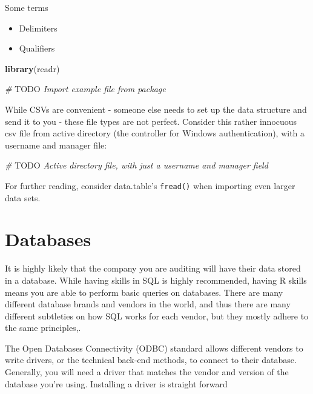 \documentclass[
]{book}
\newenvironment{Shaded}{\begin{snugshade}}{\end{snugshade}}
\newcommand{\AlertTok}[1]{\textcolor[rgb]{0.94,0.16,0.16}{#1}}
\newcommand{\CommentTok}[1]{\textcolor[rgb]{0.56,0.35,0.01}{\textit{#1}}}
\newcommand{\KeywordTok}[1]{\textcolor[rgb]{0.13,0.29,0.53}{\textbf{#1}}}
\newcommand{\NormalTok}[1]{#1}
\providecommand{\tightlist}{%
  \setlength{\itemsep}{0pt}\setlength{\parskip}{0pt}}
\begin{document}
Some terms

\begin{itemize}
\tightlist
\item
  Delimiters
\item
  Qualifiers
\end{itemize}

\begin{Shaded}
\begin{Highlighting}[]
\KeywordTok{library}\NormalTok{(readr)}

\CommentTok{# }\AlertTok{TODO}\CommentTok{ Import example file from package}
\end{Highlighting}
\end{Shaded}

While CSVs are convenient - someone else needs to set up the data structure and send it to you - these file types are not perfect. Consider this rather innocuous csv file from active directory (the controller for Windows authentication), with a username and manager file:

\begin{Shaded}
\begin{Highlighting}[]
\CommentTok{# }\AlertTok{TODO}\CommentTok{ Active directory file, with just a username and manager field}
\end{Highlighting}
\end{Shaded}

For further reading, consider data.table's \texttt{fread()} when importing even larger data sets.

\hypertarget{databases-1}{%
\section{Databases}\label{databases-1}}

It is highly likely that the company you are auditing will have their data stored in a database. While having skills in SQL is highly recommended, having R skills means you are able to perform basic queries on databases. There are many different database brands and vendors in the world, and thus there are many different subtleties on how SQL works for each vendor, but they mostly adhere to the same principles,.

The Open Databases Connectivity (ODBC) standard allows different vendors to write drivers, or the technical back-end methods, to connect to their database. Generally, you will need a driver that matches the vendor and version of the database you're using. Installing a driver is straight forward
\end{document}
